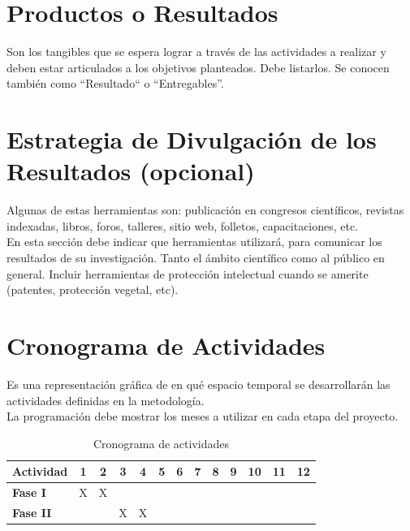 \documentclass[12pt,a4paper]{article}
\begin{document}
\section{Productos o Resultados}
\noindent
Son los tangibles que se espera lograr a través de las actividades a realizar y deben estar
articulados a los objetivos planteados. Debe listarlos. Se conocen
también como “Resultado“ o “Entregables”.

\section{Estrategia de Divulgación de los Resultados (opcional)}
\noindent
Algunas de estas herramientas son: publicación en congresos científicos, revistas
indexadas, libros, foros, talleres, sitio web, folletos, capacitaciones, etc. \\

\noindent
En esta sección debe indicar que herramientas utilizará, para comunicar los resultados
de su investigación. Tanto el ámbito científico como al público en general.
Incluir herramientas de protección intelectual cuando se amerite (patentes, protección
vegetal, etc).


\section{Cronograma de Actividades}
\noindent
Es una representación gráfica de en qué espacio temporal se desarrollarán las
actividades definidas en la metodología.\\

\noindent
La programación debe mostrar los meses a utilizar en cada etapa del proyecto.

\begin{table}[H] %
    
    \centering
    \begin{tabular}{lcccccccccccc} %
        \toprule
        \textbf{Actividad} & 1 & 2 & 3 & 4 & 5 & 6 & 7 & 8 & 9 & 10 & 11 & 12 \\
        \midrule
        \textbf{Fase I}  & X & X &  &  &  &  &  &  &  &  &  &  \\
        \textbf{Fase II} &  &  & X & X &  &  &  &  &  &  &  &  \\
        \bottomrule
    \end{tabular}
    \caption{Cronograma de actividades} %
    \label{tab:cronograma}
\end{table}
\end{document}
